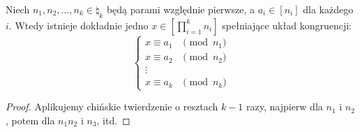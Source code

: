\begin{corollary}
	Niech $n_1, n_2, \ldots, n_k \in \natural_k$ będą parami względnie pierwsze,
	a $a_i \in [n_i]$ dla każdego $i$. Wtedy istnieje dokładnie jedno $x \in [\prod_{i=1}^{k} n_i]$
	spełniające układ kongruencji:
	\begin{equation*}
		\begin{cases}
			x \equiv a_1 & \pmod {n_1} \\
			x \equiv a_2 & \pmod {n_2} \\
			\vdots                     \\
			x \equiv a_k & \pmod {n_k}
		\end{cases}
	\end{equation*}
\end{corollary}
\begin{proof}
	Aplikujemy chińskie twierdzenie o resztach $k-1$ razy, najpierw dla $n_1$ i $n_2$,
	potem dla $n_1n_2$ i $n_3$, itd.
\end{proof}

